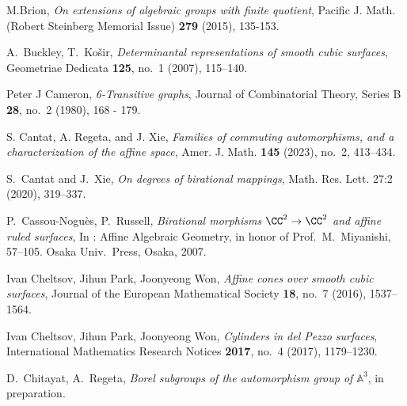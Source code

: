 M.Brion,
\emph{On extensions of algebraic groups with finite quotient},
Pacific J. Math. (Robert Steinberg Memorial Issue) \textbf{279} (2015), 135-153.


A.~Buckley, T.~Ko{\v{s}}ir, \emph{Determinantal representations of smooth cubic surfaces}, Geometriae Dedicata \textbf{125}, no.~1 (2007), 115--140.

Peter J Cameron, \emph{6-Transitive graphs}, Journal of Combinatorial Theory, Series B \textbf{28}, no.~2 (1980), 168 - 179.


S. Cantat, A. Regeta, and J. Xie, \emph{Families of commuting automorphisms, and a characterization of the affine space}, Amer. J. Math. \textbf{145} (2023), no.~2, 413--434.


S.~Cantat and J.~Xie,
\emph{On degrees of birational mappings},
Math. Res. Lett. 27:2 (2020), 319--337.

P.~Cassou-Nogu\`es,  P.~Russell, \emph{Birational morphisms $\CC^2
\to \CC^2$ and
affine ruled surfaces}, In : Affine Algebraic Geometry, in honor of
Prof.\ M.~Miyanishi, 57--105. Osaka Univ.\ Press, Osaka, 2007.

Ivan Cheltsov, Jihun Park, Joonyeong Won, \emph{Affine cones over smooth cubic surfaces}, Journal of the European Mathematical Society \textbf{18}, no.~7 (2016), 1537--1564.


Ivan Cheltsov, Jihun Park, Joonyeong Won, \emph{Cylinders in del Pezzo surfaces}, International Mathematics Research Notices \textbf{2017}, no.~4 (2017), 1179--1230.

D.~Chitayat, A.~Regeta,
\emph{Borel subgroups of the automorphism group of $\mathbb{A}^3$},
in preparation.

